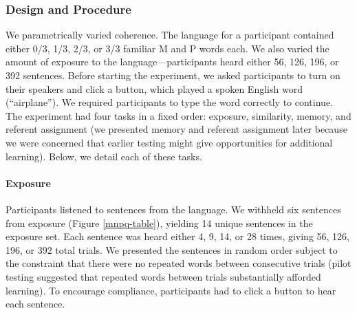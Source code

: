 \documentclass[man,floatsintext]{apa6}
\begin{document}
\subsubsection{Design and Procedure}

We parametrically varied coherence. The language for a participant contained either 0/3, 1/3, 2/3, or 3/3 familiar M and P words each. We also varied the amount of exposure to the language---participants heard either 56, 126, 196, or 392 sentences. Before starting the experiment, we asked participants to turn on their speakers and click a button, which played a spoken English word (``airplane''). We required participants to type the word correctly to continue. The experiment had four tasks in a fixed order: exposure, similarity, memory, and referent assignment (we presented memory and referent assignment later because we were concerned that earlier testing might give opportunities for additional learning). Below, we detail each of these tasks.

\paragraph{Exposure}
Participants listened to sentences from the language. We withheld six sentences from exposure (Figure \ref{mnpq-table}), yielding 14 unique sentences in the exposure set. Each sentence was heard either 4, 9, 14, or 28 times, giving 56, 126, 196, or 392 total trials. We presented the sentences in random order subject to the constraint that there were no repeated words between consecutive trials (pilot testing suggested that repeated words between trials substantially afforded learning). To encourage compliance, participants had to click a button to hear each sentence.
\end{document}
